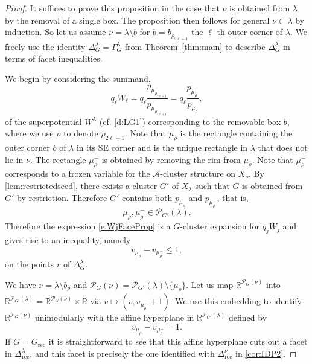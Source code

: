 \documentclass{amsart}
\theoremstyle{definition}
\numberwithin{equation}{section}
\newcommand{\R}{\mathbb R}
\newcommand{\Q}{\Gamma}
\newcommand{\rect}{\mathrm{rec}}
\begin{document}
\begin{proof}
It suffices to prove this proposition in the case that $\nu$ is obtained from $\lambda$ by the removal of a single box. The proposition then follows for general $\nu\subset \lambda$ by induction. So let us assume $\nu=\lambda\setminus b$ for $b=b_{\rho_{2\ell+1}}$ the $\ell$-th outer corner of $\lambda$. We 
freely use the identity $\Delta^\lambda_G=\Q^\lambda_G$ from 
	Theorem~\ref{thm:main} 
	to describe $\Delta^\lambda_G$ in terms of facet inequalities.
	
We begin by considering the summand, 
\begin{equation}\label{e:WjFaceProp}
q_\ell W_\ell
	=q_\ell\frac{p_{\mu_{\rho_{2\ell+1}}^-}}{p_{\mu_{\rho_{2\ell+1}}}}
	=q_\ell\frac{p_{\mu_{\rho}^-}}{p_{\mu_{\rho}}},
\end{equation}
of the superpotential $W^\lambda$ (cf. \cref{d:LG1}) corresponding to the removable box $b$,
	where we use $\rho$ to denote $\rho_{2\ell+1}$.
	Note that $\mu_{\rho}$ is the rectangle containing the outer corner $b$ of $\lambda$ in its SE corner and is the unique rectangle in $\lambda$ that does not lie in $\nu$. The rectangle $\mu_{\rho}^-$ is obtained by removing the rim from $\mu_{\rho}$. Note that $\mu_{\rho}^-$ corresponds to a frozen variable for the $\mathcal A$-cluster structure on $X_\nu$.  
By \cref{lem:restrictedseed}, there exists a 
cluster $G'$ of $X_\lambda$ such that $G$ is obtained from $G'$
by restriction.  Therefore $G'$ contains both $p_{\mu_{\rho}}$ and $p_{\mu_{\rho}^-}$, that is,
\[\mu_{\rho},\mu_{\rho}^-\in\mathcal P_{G'}(\lambda).\] 
Therefore the expression \eqref{e:WjFaceProp} is a $G$-cluster expansion for $q_j W_j$ and gives rise to an inequality, namely
\begin{equation}\label{e:inequalityWj}v_{\mu_{\rho}}- v_{\mu_{\rho}^-}\le 1,
\end{equation}
on the points $v$ of $\Delta^\lambda_G$. 

We have $\nu=\lambda\setminus b_{\rho}$ and $\mathcal P_G(\nu)=\mathcal P_{G'}(\lambda)\setminus\{\mu_{\rho}\}$. Let us map $\R^{\mathcal P_G(\nu)}$ into  $\R^{\mathcal P_{G'}(\lambda)}=\R^{\mathcal P_G(\nu)}\times \R$
via $v\mapsto ( v,v_{\mu_{\rho}^-}+1)$. We use this embedding to identify $\R^{\mathcal P_G(\nu)}$ unimodularly with the affine hyperplane in $\R^{\mathcal P_{G'}(\lambda)}$ defined by 
\begin{equation}\label{e:FacetHyperplane}
v_{\mu_{\rho}}- v_{\mu_{\rho}^-}= 1.
\end{equation}
If $G=G_\rect$ it is straightforward to see that this affine hyperplane cuts out a facet in $\Delta^\lambda_\rect$, 
	and this facet is precisely the one identified with $\Delta^\nu_\rect$ in \cref{cor:IDP2}. 
	

\end{proof}
\end{document}
